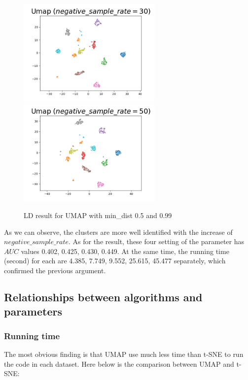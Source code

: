 \begin{figure}[H]
\centering  %
{
\label{Fig.sub.1}
\includegraphics[width=7cm,height=3.5cm\textwidth]{images/umap/umap_neg_30.png}}
{
\label{Fig.sub.2}
\includegraphics[width=7cm,height=3.5cm\textwidth]{images/umap/umap_neg_50.png}}
\caption{LD result for UMAP with min\_dist 0.5 and 0.99}
\end{figure}

\noindent As we can observe, the clusters are more well identified with the increase of $negative\_sample\_rate$. As for the result, these four setting of the parameter has $AUC$ values 0.402, 0.425,  0.430, 0.449. At the same time, the running time (second) for each are 4.385, 7.749, 9.552,  25.615,  45.477 separately, which confirmed the previous argument.\\

\subsection{Relationships between algorithms and parameters}

\subsubsection{Running time}

The most obvious finding is that UMAP use much less time than t-SNE to run the code in each dataset. Here below is the comparison between UMAP and t-SNE: 

